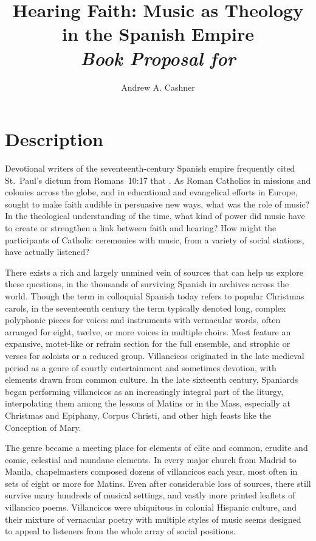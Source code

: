 \documentclass{vcbook-proposal}
\title{Hearing Faith: Music as Theology in the Spanish Empire\\
\emph{Book Proposal for \publisher}}
\author{Andrew A. Cashner}
\begin{document}
\maketitle

\tableofcontents
\clearpage

\section{Description}

Devotional writers of the seventeenth-century Spanish empire frequently cited 
St.~Paul's dictum from Romans~10:17 that .
As Roman Catholics in missions and colonies across the globe, and in 
educational and evangelical efforts in Europe, sought to make faith audible in 
persuasive new ways, what was the role of music?
In the theological understanding of the time, what kind of power did music have 
to create or strengthen a link between faith and hearing?
How might the participants of Catholic ceremonies with music, from a variety of 
social stations, have actually listened?

There exists a rich and largely unmined vein of sources that can help us 
explore these questions, in the thousands of surviving Spanish 
 in archives across the world.
Though the term  in colloquial Spanish today refers to popular
Christmas carols, in the seventeenth century the term typically denoted long,
complex polyphonic pieces for voices and instruments with vernacular words,
often arranged for eight, twelve, or more voices in multiple choirs.
Most feature an expansive, motet-like  or refrain section for 
the full ensemble, and strophic  or verses for soloists or a 
reduced group.
Villancicos originated in the late medieval period as a genre of courtly 
entertainment and sometimes devotion, with elements drawn from common culture.
In the late sixteenth century, Spaniards began performing villancicos as an 
increasingly integral part of the liturgy, interpolating them among the lessons 
of Matins or in the Mass, especially at Christmas and Epiphany, Corpus Christi, 
and other high feasts like the Conception of Mary.

The genre became a meeting place for elements of elite and common, erudite and 
comic, celestial and mundane elements.
In every major church from Madrid to Manila, chapelmasters composed dozens of
villancicos each year, most often in sets of eight or more for Matins.
Even after considerable loss of sources, there still survive many hundreds of 
musical settings, and vastly more printed leaflets of villancico poems. 
Villancicos were ubiquitous in colonial Hispanic culture, and their mixture of 
vernacular poetry with multiple styles of music seems designed to appeal to 
listeners from the whole array of social positions.
\end{document}
